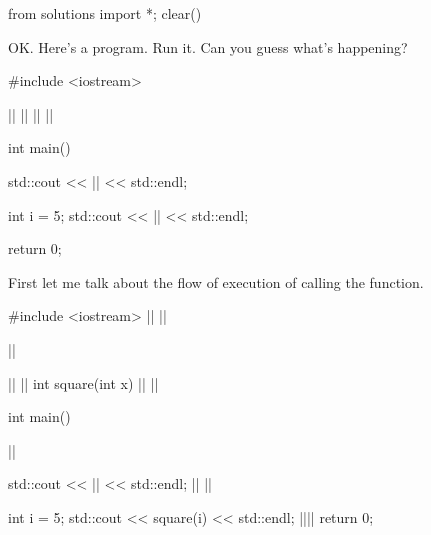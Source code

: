 \begin{python0}
from solutions import *; clear()
\end{python0}

OK. Here's a program. Run it. Can you guess what's happening?
\begin{consolethree}[escapeinside=||]
#include <iostream>
         
||
|\textred{\textbf{\{}}|
    ||
|\textred{\textbf{\}}}|

int main()
{
    std::cout << || << std::endl;

    int i = 5;
    std::cout << || << std::endl;

    return 0;
}
\end{consolethree}

First let me talk about the flow of execution of calling the function.

\begin{consolethree}[escapeinside=||]
#include <iostream>
 ||                                                        ||

||





 ||     ||
int square(int x)
{
    ||
}
||



int main()
{||

    std::cout << || << std::endl;
                      ||                                   ||
    
    int i = 5;                    
    std::cout << square(i) << std::endl;
||||
    return 0;
}
\end{consolethree}

